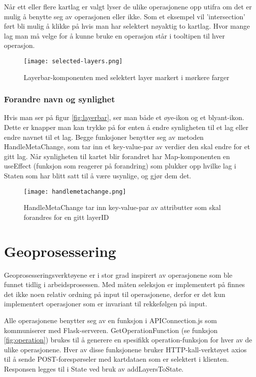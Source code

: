 Når ett eller flere kartlag er valgt lyser de ulike operasjonene opp utifra om det er mulig å benytte seg av operasjonen eller ikke. Som et eksempel vil 'intersection' ført bli mulig å klikke på hvis man har selektert nøyaktig to kartlag. Hvor mange lag man må velge for å kunne bruke en operasjon står i tooltipen til hver operasjon.  

\begin{figure}[h]
    \center
    \texttt{[image: selected-layers.png]}
    \caption{Layerbar-komponenten med selektert layer markert i mørkere farger}
    \label{fig:selected}
\end{figure}

\subsubsection{Forandre navn og synlighet}

Hvis man ser på figur \ref{fig:layerbar}, ser man både et øye-ikon og et blyant-ikon. Dette er knapper man kan trykke på for enten å endre synligheten til et lag eller endre navnet til et lag. Begge funksjoner benytter seg av metoden HandleMetaChange, som tar inn et key-value-par av verdier den skal endre for et gitt lag. Når synligheten til kartet blir forandret har Map-komponenten en useEffect (funksjon som reagerer på forandring) som plukker opp hvilke lag i Staten som har blitt satt til å være usynlige, og gjør dem det. 

\begin{figure}[h]
    \center
    \texttt{[image: handlemetachange.png]}
    \caption{HandleMetaChange tar inn key-value-par av attributter som skal forandres for en gitt layerID}
    \label{fig:selected}
\end{figure}

\section{Geoprosessering}
\label{sec:geoprosessering}

Geoprosesseringsverktøyene er i stor grad inspirert av operasjonene som ble funnet tidlig i arbeidsprosessen. Med måten seleksjon er implementert på finnes det ikke noen relativ ordning på input til operasjonene, derfor er det kun implementert operasjoner som er invariant til rekkefølgen på input. 

Alle operasjonene benytter seg av en funksjon i APIConnection.js som kommuniserer med Flask-serveren. GetOperationFunction (se funksjon \ref{fig:operation}) brukes til å generere  en spesifikk operation-funksjon for hver av de ulike operasjonene. Hver av disse funksjonene bruker HTTP-kall-verktøyet axios til å sende POST-forespørseler med kartdataen som er selektert i klienten. Responsen legges til i State ved bruk av addLayersToState.    

